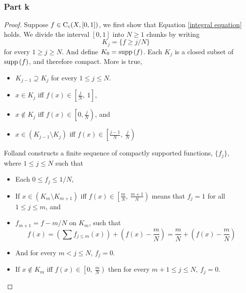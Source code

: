 \documentclass[../../main.tex]{subfiles}
\begin{document}
\subsubsection*{Part k}
\begin{proof}
    Suppose $f\in\operatorname{C}_c({X,[0,1]})$, we first show that Equation \eqref{integral equation} holds. We divide the interval $[0,1]$ into $N\geq1$ chunks by writing 
    \[
    K_j = \{f\geq j/N\}
    \]
    for every $1\geq j\geq N$. And define $K_0=\operatorname{supp}{(f)}$. Each $K_j$ is a closed subset of $\operatorname{supp}{(f)}$, and therefore compact. More is true, 
    \begin{itemize}
        \item $K_{j-1}\supseteq K_j$ for every $1\leq j\leq N$.
        \item $x\in K_j$ iff $f(x)\in \left[\frac{j}{N},\: 1\right]$,
        \item $x\notin K_j$ iff $f(x)\in \left[0,\frac{j}{N}\right)$, and
        \item $x\in (K_{j-1}\setminus K_j)$ iff $f(x)\in \left[\frac{j-1}{N},\:\frac{j}{N}\right)$
    \end{itemize}
    Folland constructs a finite sequence of compactly supported functions, $\{f_j\}$, where $1\leq j \leq N$ such that
    \begin{itemize}
        \item Each $0\leq f_j\leq 1/N$,
        \item If $x\in (K_{m}\setminus K_{m+1})$ iff $f(x)\in\left[\frac{m}{N},\:\frac{m+1}{N}\right)$ means that $f_j=1$ for all $1\leq j\leq m$, and
        \item $f_{m+1} = f-m/N$ on $K_m$, such that 
        \[
        f(x) = \left(\sum f_{j\leq m}(x)\right) + \left(f(x)-\dfrac{m}{N}\right) = \dfrac{m}{N} + \left(f(x)-\dfrac{m}{N}\right)
        \]
        \item And for every $m<j\leq N$, $f_j=0$.
        \item If $x\notin K_m$ iff $f(x)\in\left[0,\:\frac{m}{N}\right)$ then for every $m+1\leq j\leq N,\:f_j=0$.
        

\end{itemize}
\end{proof}
\end{document}
